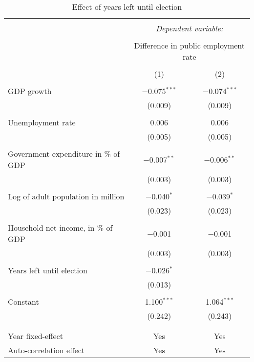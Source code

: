 
\begin{table}[!htbp] \centering 
  \caption{Effect of years left until election} 
  \label{} 
\begin{tabular}{@{\extracolsep{5pt}}lcc} 
\\[-1.8ex]\hline 
\hline \\[-1.8ex] 
 & \multicolumn{2}{c}{\textit{Dependent variable:}} \\ 
\cline{2-3} 
\\[-1.8ex] & \multicolumn{2}{c}{Difference in public employment rate} \\ 
\\[-1.8ex] & (1) & (2)\\ 
\hline \\[-1.8ex] 
 GDP growth & $-$0.075$^{***}$ & $-$0.074$^{***}$ \\ 
  & (0.009) & (0.009) \\ 
  & & \\ 
 Unemployment rate & 0.006 & 0.006 \\ 
  & (0.005) & (0.005) \\ 
  & & \\ 
 Government expenditure in \% of GDP & $-$0.007$^{**}$ & $-$0.006$^{**}$ \\ 
  & (0.003) & (0.003) \\ 
  & & \\ 
 Log of adult population in million & $-$0.040$^{*}$ & $-$0.039$^{*}$ \\ 
  & (0.023) & (0.023) \\ 
  & & \\ 
 Household net income, in \% of GDP & $-$0.001 & $-$0.001 \\ 
  & (0.003) & (0.003) \\ 
  & & \\ 
 Years left until election & $-$0.026$^{*}$ &  \\ 
  & (0.013) &  \\ 
  & & \\ 
 Constant & 1.100$^{***}$ & 1.064$^{***}$ \\ 
  & (0.242) & (0.243) \\ 
  & & \\ 
\hline \\[-1.8ex] 
Year fixed-effect & Yes & Yes \\ 
Auto-correlation effect & Yes & Yes \\ 

\end{tabular}
\end{table}
